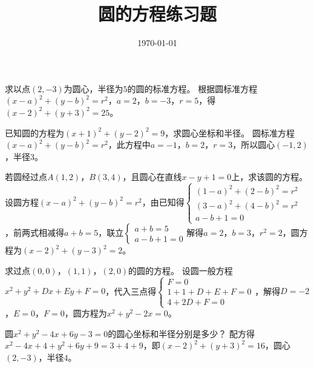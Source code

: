 \documentclass{article}
\title{圆的方程练习题}
\date{\today} %
\begin{document}

\maketitle %




\begin{ExerciseList}
\Exercise
求以点\((2, -3)\)为圆心，半径为\(5\)的圆的标准方程。
\Answer
根据圆标准方程\((x - a)^2+(y - b)^2 = r^2\)，\(a = 2\)，\(b=-3\)，\(r = 5\)，得\((x - 2)^2+(y + 3)^2 = 25\)。

\Exercise
已知圆的方程为\((x + 1)^2+(y - 2)^2 = 9\)，求圆心坐标和半径。
\Answer
圆标准方程\((x - a)^2+(y - b)^2 = r^2\)，此方程中\(a=-1\)，\(b = 2\)，\(r = 3\)，所以圆心\((-1,2)\)，半径\(3\)。

\Exercise
若圆经过点\(A(1,2)\)，\(B(3,4)\)，且圆心在直线\(x - y + 1 = 0\)上，求该圆的方程。
\Answer
设圆方程\((x - a)^2+(y - b)^2 = r^2\)，由已知得\(\begin{cases}(1 - a)^2+(2 - b)^2 = r^2\\(3 - a)^2+(4 - b)^2 = r^2\\a - b+1 = 0\end{cases}\)，前两式相减得\(a + b = 5\)，联立\(\begin{cases}a + b = 5\\a - b+1 = 0\end{cases}\)解得\(a = 2\)，\(b = 3\)，\(r^2 = 2\)，圆方程为\((x - 2)^2+(y - 3)^2 = 2\)。

\Exercise
求过点\((0,0)\)，\((1,1)\)，\((2,0)\)的圆的方程。
\Answer
设圆一般方程\(x^{2}+y^{2}+Dx + Ey+F = 0\)，代入三点得\(\begin{cases}F = 0\\1 + 1+D + E+F = 0\\4+2D+F = 0\end{cases}\)，解得\(D=-2\)，\(E = 0\)，\(F = 0\)，圆方程为\(x^{2}+y^{2}-2x = 0\)。

\Exercise
圆\(x^2 + y^2 - 4x + 6y - 3 = 0\)的圆心坐标和半径分别是多少？
\Answer
配方得\(x^{2}-4x + 4+y^{2}+6y+9=3 + 4+9\)，即\((x - 2)^2+(y + 3)^2 = 16\)，圆心\((2,-3)\)，半径\(4\)。
\end{ExerciseList}
\end{document}
